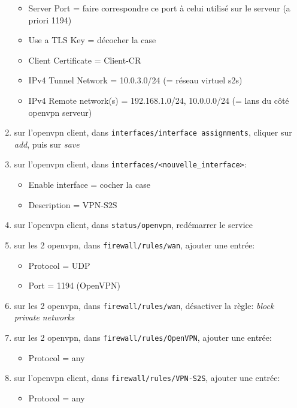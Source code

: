 \documentclass[a4paper]{article}
\begin{document}
\begin{enumerate}
\begin{itemize}
        \item Server Port = faire correspondre ce port à celui utilisé sur le serveur (a priori 1194)
        \item Use a TLS Key = décocher la case
        \item Client Certificate = Client-CR
        \item IPv4 Tunnel Network = 10.0.3.0/24 (= réseau virtuel s2s)
        \item IPv4 Remote network(s) = 192.168.1.0/24, 10.0.0.0/24 (= lans du côté openvpn serveur)
    \end{itemize}
    \item sur l'openvpn client, dans \texttt{interfaces/interface assignments}, cliquer sur \textit{add}, puis sur \textit{save}
    \item sur l'openvpn client, dans \texttt{interfaces/<nouvelle\_interface>}:
    \begin{itemize}
        \item Enable interface = cocher la case
        \item Description = VPN-S2S
    \end{itemize}
    \item sur l'openvpn client, dans \texttt{status/openvpn}, redémarrer le service
    \item sur les 2 openvpn, dans \texttt{firewall/rules/wan}, ajouter une entrée:
    \begin{itemize}
        \item Protocol = UDP
        \item Port = 1194 (OpenVPN)
    \end{itemize}
    \item sur les 2 openvpn, dans \texttt{firewall/rules/wan}, désactiver la règle: \textit{block private networks}
    \item sur les 2 openvpn, dans \texttt{firewall/rules/OpenVPN}, ajouter une entrée:
    \begin{itemize}
        \item Protocol = any
    \end{itemize}
    \item sur l'openvpn client, dans \texttt{firewall/rules/VPN-S2S}, ajouter une entrée:
    \begin{itemize}
        \item Protocol = any
    \end{itemize}
\end{enumerate}
\end{document}

